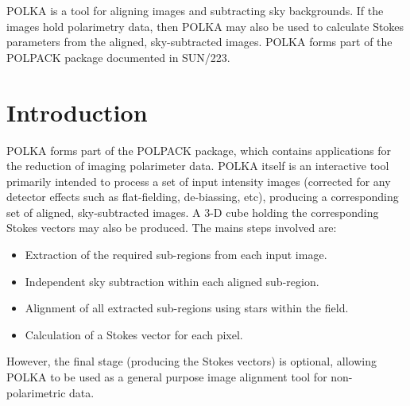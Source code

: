 \documentclass[11pt]{article}
\newcommand{\stardocname}{POLKA Hypertext Help}
\newenvironment{latexonly}{}{}
\newcommand{\xref}[3]{#1}
\newcommand{\xlabel}[1]{}
\newcommand{\latexonlytoc}[0]{\tableofcontents}
\newcommand{\mylabel}[1] {\xlabel{#1}\label{#1}}
\renewcommand{\thepage}{\roman{page}}
\begin{document}

POLKA is a tool for aligning images and subtracting sky backgrounds. If
the images hold polarimetry data, then POLKA may also be used to
calculate Stokes parameters from the aligned, sky-subtracted images.
POLKA forms part of the POLPACK package documented in SUN/223.

 \newpage
 \begin{latexonly}
   \setlength{\parskip}{0mm}
   \latexonlytoc
   \setlength{\parskip}{\medskipamount}
   \markright{\stardocname}
 \end{latexonly}
\newpage
\renewcommand{\thepage}{\arabic{page}}
\setcounter{page}{1}

\section {\mylabel{POLKA_OVERVIEW}Introduction}
POLKA forms part of the \xref{POLPACK}{sun223}{} package, which contains
applications for the reduction of imaging polarimeter data. POLKA itself
is an interactive tool primarily intended to process a set of input
intensity images (corrected for any detector effects such as
flat-fielding, de-biassing, etc), producing a corresponding set of
aligned, sky-subtracted images. A 3-D cube holding the corresponding
Stokes vectors may also be produced. The mains steps involved are:

\begin{itemize}
\item Extraction of the required sub-regions from each input image.
\item Independent sky subtraction within each aligned sub-region.
\item Alignment of all extracted sub-regions using stars within the field.
\item Calculation of a Stokes vector for each pixel.
\end{itemize}

However, the final stage (producing the Stokes vectors) is optional,
allowing POLKA to be used as a general purpose image alignment tool for
non-polarimetric data.
\end{document}
